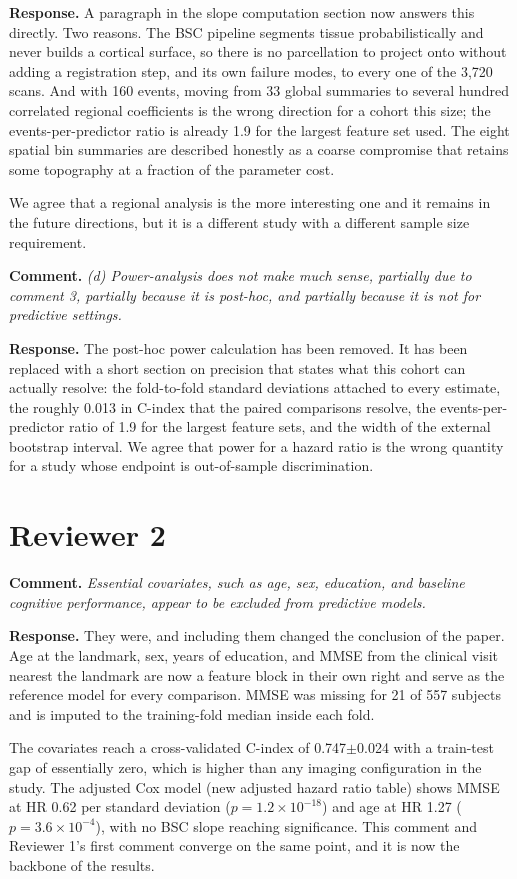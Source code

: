 \documentclass[11pt]{article}
\newcommand{\comment}[1]{\vspace{6pt}\noindent\textbf{Comment.} \textit{#1}\par\vspace{2pt}}
\newcommand{\response}{\noindent\textbf{Response.} }
\begin{document}
\response A paragraph in the slope computation section now answers this directly. Two reasons. The BSC pipeline segments tissue probabilistically and never builds a cortical surface, so there is no parcellation to project onto without adding a registration step, and its own failure modes, to every one of the 3,720 scans. And with 160 events, moving from 33 global summaries to several hundred correlated regional coefficients is the wrong direction for a cohort this size; the events-per-predictor ratio is already 1.9 for the largest feature set used. The eight spatial bin summaries are described honestly as a coarse compromise that retains some topography at a fraction of the parameter cost.

We agree that a regional analysis is the more interesting one and it remains in the future directions, but it is a different study with a different sample size requirement.

\comment{(d) Power-analysis does not make much sense, partially due to comment 3, partially because it is post-hoc, and partially because it is not for predictive settings.}

\response The post-hoc power calculation has been removed. It has been replaced with a short section on precision that states what this cohort can actually resolve: the fold-to-fold standard deviations attached to every estimate, the roughly 0.013 in C-index that the paired comparisons resolve, the events-per-predictor ratio of 1.9 for the largest feature sets, and the width of the external bootstrap interval. We agree that power for a hazard ratio is the wrong quantity for a study whose endpoint is out-of-sample discrimination.

\section*{Reviewer 2}

\comment{Essential covariates, such as age, sex, education, and baseline cognitive performance, appear to be excluded from predictive models.}

\response They were, and including them changed the conclusion of the paper. Age at the landmark, sex, years of education, and MMSE from the clinical visit nearest the landmark are now a feature block in their own right and serve as the reference model for every comparison. MMSE was missing for 21 of 557 subjects and is imputed to the training-fold median inside each fold.

The covariates reach a cross-validated C-index of 0.747$\pm$0.024 with a train-test gap of essentially zero, which is higher than any imaging configuration in the study. The adjusted Cox model (new adjusted hazard ratio table) shows MMSE at HR 0.62 per standard deviation ($p = 1.2\times10^{-18}$) and age at HR 1.27 ($p = 3.6\times10^{-4}$), with no BSC slope reaching significance. This comment and Reviewer 1's first comment converge on the same point, and it is now the backbone of the results.
\end{document}
